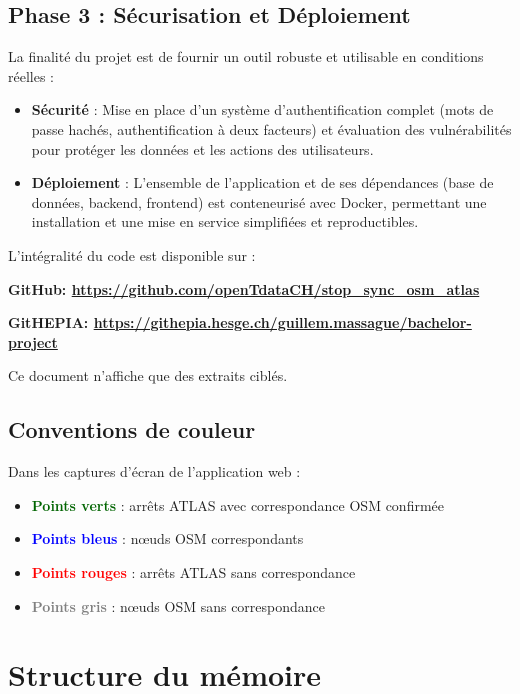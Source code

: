 \subsection*{Phase 3 : Sécurisation et Déploiement}
La finalité du projet est de fournir un outil robuste et utilisable en conditions réelles :
\begin{itemize}
    \item \textbf{Sécurité} : Mise en place d'un système d'authentification complet (mots de passe hachés, authentification à deux facteurs) et évaluation des vulnérabilités pour protéger les données et les actions des utilisateurs.
    \item \textbf{Déploiement} : L'ensemble de l'application et de ses dépendances (base de données, backend, frontend) est conteneurisé avec Docker, permettant une installation et une mise en service simplifiées et reproductibles.
\end{itemize}

L'intégralité du code est disponible sur :
\begin{center}
\textbf{GitHub: \href{https://github.com/openTdataCH/stop\_sync\_osm\_atlas}{https://github.com/openTdataCH/stop\_sync\_osm\_atlas}}

\textbf{GitHEPIA: \href{https://githepia.hesge.ch/guillem.massague/bachelor-project}{https://githepia.hesge.ch/guillem.massague/bachelor-project}}
\end{center}

Ce document n'affiche que des extraits ciblés. 

\subsection*{Conventions de couleur}

Dans les captures d'écran de l'application web :
\begin{itemize}
   \item \textcolor{darkgreen}{\textbf{Points verts}} : arrêts ATLAS avec correspondance OSM confirmée
   \item \textcolor{blue}{\textbf{Points bleus}} : nœuds OSM correspondants
   \item \textcolor{red}{\textbf{Points rouges}} : arrêts ATLAS sans correspondance
   \item \textcolor{gray}{\textbf{Points gris}} : nœuds OSM sans correspondance
\end{itemize}

\section*{Structure du mémoire}


